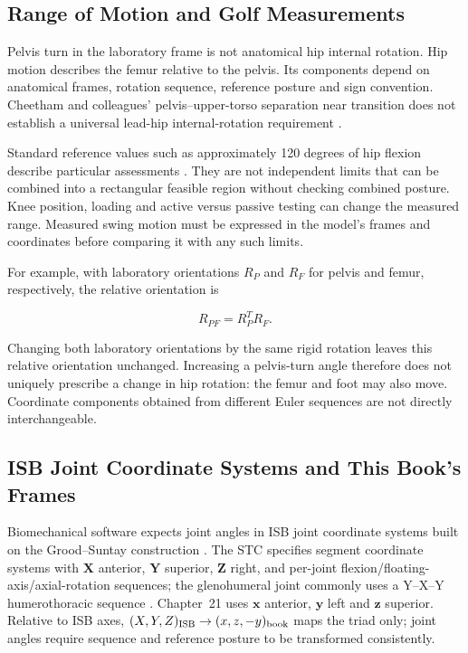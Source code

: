 \subsection{Range of Motion and Golf Measurements}\label{range-of-motion-and-golf-measurements}

Pelvis turn in the laboratory frame is not anatomical hip internal rotation. Hip motion describes the femur relative to the pelvis. Its components depend on anatomical frames, rotation sequence, reference posture and sign convention. Cheetham and colleagues' pelvis--upper-torso separation near transition does not establish a universal lead-hip internal-rotation requirement \citep{Cheetham2001}.

Standard reference values such as approximately 120 degrees of hip flexion describe particular assessments \citep{Neumann2017}. They are not independent limits that can be combined into a rectangular feasible region without checking combined posture. Knee position, loading and active versus passive testing can change the measured range. Measured swing motion must be expressed in the model's frames and coordinates before comparing it with any such limits.

For example, with laboratory orientations \(R_P\) and \(R_F\) for pelvis and femur, respectively, the relative orientation is

\[
R_{PF}=R_P^T R_F.
\]

Changing both laboratory orientations by the same rigid rotation leaves this relative orientation unchanged. Increasing a pelvis-turn angle therefore does not uniquely prescribe a change in hip rotation: the femur and foot may also move. Coordinate components obtained from different Euler sequences are not directly interchangeable.

\subsection{ISB Joint Coordinate Systems and This Book's Frames}\label{sec:isb_jcs}

Biomechanical software expects joint angles in ISB joint coordinate systems built on the Grood--Suntay construction \citep{Grood1983,Wu2002,Wu2005}. The STC specifies segment coordinate systems with \(\mathbf X\) anterior, \(\mathbf Y\) superior, \(\mathbf Z\) right, and per-joint flexion/floating-axis/axial-rotation sequences; the glenohumeral joint commonly uses a Y--X--Y humerothoracic sequence \citep{Wu2005}. Chapter~21 uses \(\mathbf x\) anterior, \(\mathbf y\) left and \(\mathbf z\) superior. Relative to ISB axes, \((X,Y,Z)_{\rm ISB}\to(x,z,-y)_{\rm book}\) maps the triad only; joint angles require sequence and reference posture to be transformed consistently.

